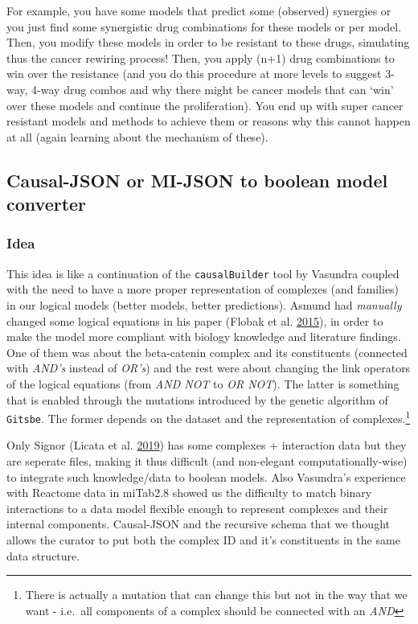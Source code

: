 \documentclass[
  12pt,
]{book}
\begin{document}
For example, you have some models that predict some (observed) synergies or you just find some synergistic drug combinations for these models or per model.
Then, you modify these models in order to be resistant to these drugs, simulating thus the cancer rewiring process!
Then, you apply (n+1) drug combinations to win over the resistance (and you do this procedure at more levels to suggest
3-way, 4-way drug combos and why there might be cancer models that can `win' over these models and continue the proliferation).
You end up with super cancer resistant models and methods to achieve them or reasons why this cannot happen at all (again learning about the mechanism of these).

\hypertarget{causal-json-or-mi-json-to-boolean-model-converter}{%
\subsection*{Causal-JSON or MI-JSON to boolean model converter}\label{causal-json-or-mi-json-to-boolean-model-converter}}

\hypertarget{idea}{%
\subsubsection*{Idea}\label{idea}}

This idea is like a continuation of the \texttt{causalBuilder} tool by Vasundra coupled with the need to have a more proper representation of complexes (and families) in our logical models (better models, better predictions).
Asmund had \emph{manually} changed some logical equations in his paper (Flobak et al. \protect\hyperlink{ref-Flobak2015}{2015}), in order to make the model more compliant with biology knowledge and literature findings.
One of them was about the beta-catenin complex and its constituents (connected with \emph{AND's} instead of \emph{OR's}) and the rest were about changing the link operators of the logical equations (from \emph{AND NOT} to \emph{OR NOT}).
The latter is something that is enabled through the mutations introduced by the genetic algorithm of \texttt{Gitsbe}.
The former depends on the dataset and the representation of complexes.\footnote{There is actually a mutation that can change this but not in the way that we want - i.e.~all components of a complex should be connected with an \emph{AND}}

Only Signor (Licata et al. \protect\hyperlink{ref-Licata2019}{2019}) has some complexes + interaction data but they are seperate files, making it thus difficult (and non-elegant computationally-wise) to integrate such knowledge/data to boolean models.
Also Vasundra's experience with Reactome data in miTab2.8 showed us the difficulty to match binary interactions to a data model flexible enough to represent complexes and their internal components. Causal-JSON and the recursive schema that we thought allows the curator to put both the complex ID and it's constituents in the same data structure.
\end{document}
